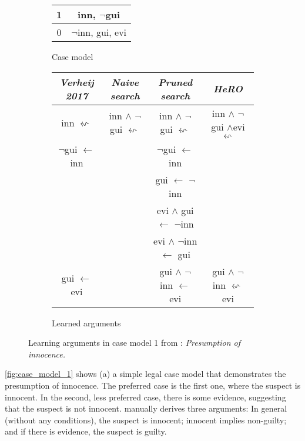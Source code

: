 \begin{figure}[h]
\centering
\begin{subfigure}{.2\textwidth}
  \centering
    \begin{tabular}{ c|c } 
        1 & inn, $\neg$gui \\ \hline
        0 & $\neg$inn, gui, evi
    \end{tabular}
  \caption{Case model}
\end{subfigure}%
\begin{subfigure}{.8\textwidth}
  \centering
    \begin{tabular}{ c|c|c|c } 
        \textit{Verheij 2017} & \textit{Naive search} & \textit{Pruned search} & \textit{HeRO} \\ \hline
        inn $\leftsquigarrow$& inn $\land$ $\neg$gui $\leftsquigarrow$ & inn $\land$ $\neg$gui $\leftsquigarrow$ & inn $\land$ $\neg$gui $\land$evi $\leftsquigarrow$ \\
        $\neg$gui $\leftarrow$ inn & & $\neg$gui $\leftarrow$ inn & \\
        & & gui $\leftarrow$ $\neg$inn & \\
        & & evi $\land$ gui $\leftarrow$ $\neg$inn & \\
        & & evi $\land$ $\neg$inn $\leftarrow$ gui & \\
        gui $\leftarrow$ evi & & gui $\land$ $\neg$inn $\leftarrow$ evi & gui $\land$ $\neg$inn $\leftsquigarrow$ evi
    \end{tabular}
  \caption{Learned arguments}
\end{subfigure}
\caption{Learning arguments in case model 1 from \cite{verheijProofProbabilities2017}: \textit{Presumption of innocence.}}
\label{fig:case_model_1}
\end{figure}

\autoref{fig:case_model_1} shows (a) a simple legal case model that demonstrates the presumption of innocence. The preferred case is the first one, where the suspect is innocent. In the second, less preferred case, there is some evidence, suggesting that the suspect is not innocent. \cite{verheijAnalyzingSimonshavenCase2020} manually derives three arguments: In general (without any conditions), the suspect is innocent; innocent implies non-guilty; and if there is evidence, the suspect is guilty. 

